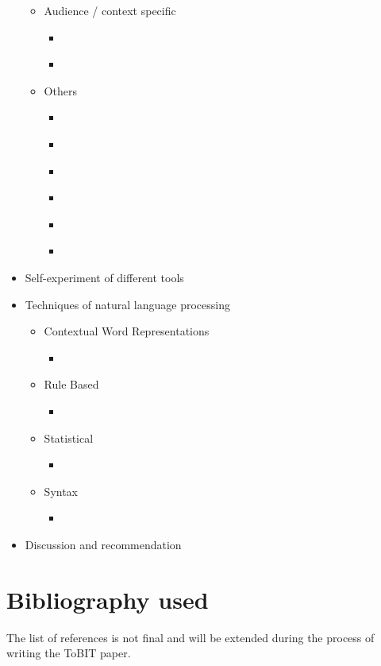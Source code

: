 \documentclass[a4paper,12pt,titlepage]{article}
\begin{document}
\begin{itemize}
\begin{itemize}
        \item Audience / context specific
        \begin{itemize}
         \item \cite{li_rethinking_2015}
         \item \cite{patout_towards_2019}
        \end{itemize}
        
        \item Others
        \begin{itemize}
            \item \cite{dodigovic_artificial_2007}
            \item \cite{chen_beyond_2008}
            \item \cite{wang_exploring_2013}
            \item \cite{vojak_new_2011}
            \item \cite{cotos_potential_2011}
            \item \cite{wang_case_2011}
        \end{itemize}

    \end{itemize}
    \item Self-experiment of different tools

    \item Techniques of natural language processing
    \begin{itemize}
     \item Contextual Word Representations
     \begin{itemize}
      \item \cite{bell_context_2019}
     \end{itemize}

     \item Rule Based
     \begin{itemize}
      \item \cite{manchanda_various_2016}
     \end{itemize}

     \item Statistical
     \begin{itemize}
      \item \cite{manchanda_various_2016}
     \end{itemize}
     \item Syntax
     \begin{itemize}
      \item \cite{manchanda_various_2016}
     \end{itemize}
    \end{itemize}
    \item Discussion and recommendation
\end{itemize}
\newpage
\section{Bibliography used}
The list of references is not final and will be extended during the process of writing the ToBIT paper.



\printnomenclature 
\end{document}
